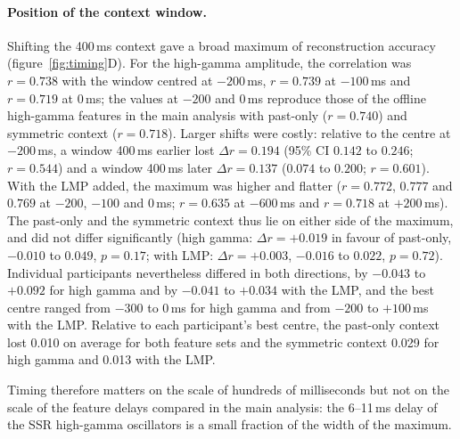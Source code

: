 \documentclass{iopjournal}
\begin{document}
\paragraph{Position of the context window.} Shifting the 400\,ms context gave a broad maximum of reconstruction accuracy (figure~\ref{fig:timing}D). For the high-gamma amplitude, the correlation was $r=0.738$ with the window centred at $-200$\,ms, $r=0.739$ at $-100$\,ms and $r=0.719$ at $0$\,ms; the values at $-200$ and $0$\,ms reproduce those of the offline high-gamma features in the main analysis with past-only ($r=0.740$) and symmetric context ($r=0.718$). Larger shifts were costly: relative to the centre at $-200$\,ms, a window 400\,ms earlier lost $\Delta r=0.194$ (95\% CI $0.142$ to $0.246$; $r=0.544$) and a window 400\,ms later $\Delta r=0.137$ ($0.074$ to $0.200$; $r=0.601$). With the LMP added, the maximum was higher and flatter ($r=0.772$, $0.777$ and $0.769$ at $-200$, $-100$ and $0$\,ms; $r=0.635$ at $-600$\,ms and $r=0.718$ at $+200$\,ms). The past-only and the symmetric context thus lie on either side of the maximum, and did not differ significantly (high gamma: $\Delta r=+0.019$ in favour of past-only, $-0.010$ to $0.049$, $p=0.17$; with LMP: $\Delta r=+0.003$, $-0.016$ to $0.022$, $p=0.72$). Individual participants nevertheless differed in both directions, by $-0.043$ to $+0.092$ for high gamma and by $-0.041$ to $+0.034$ with the LMP, and the best centre ranged from $-300$ to $0$\,ms for high gamma and from $-200$ to $+100$\,ms with the LMP. Relative to each participant's best centre, the past-only context lost 0.010 on average for both feature sets and the symmetric context 0.029 for high gamma and 0.013 with the LMP.

Timing therefore matters on the scale of hundreds of milliseconds but not on the scale of the feature delays compared in the main analysis: the 6--11\,ms delay of the SSR high-gamma oscillators is a small fraction of the width of the maximum.
\end{document}
